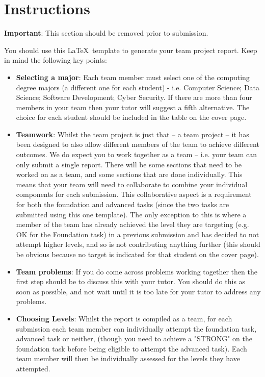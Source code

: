 \documentclass[a4paper, 11pt]{report}
\begin{document}

\tableofcontents


\newpage
\section*{Instructions}

\textbf{Important}: This section should be removed prior to submission.

You should use this \LaTeX\ template to generate your team project report. Keep in mind the following key points:
\begin{itemize}
	\item \textbf{Selecting a major}: Each team member must select one of the computing degree majors (a different one for each student) - i.e. Computer Science; Data Science; Software Development; Cyber Security. If there are more than four members in your team then your tutor will suggest a fifth alternative. The choice for each student should be included in the table on the cover page.
	\item \textbf{Teamwork}: Whilst the team project is just that -- a team project -- it has been designed to also allow different members of the team to achieve different outcomes. We do expect you to work together as a team -- i.e. your team can only submit a single report. There will be some sections that need to be worked on as a team, and some sections that are done individually. This means that your team will need to collaborate to combine your individual components for each submission. This collaborative aspect is a requirement for both the foundation and advanced tasks (since the two tasks are submitted using this one template). The only exception to this is where a member of the team has already achieved the level they are targeting (e.g. OK for the Foundation task) in a previous submission and has decided to not attempt higher levels, and so is not contributing anything further (this should be obvious because no target is indicated for that student on the cover page).
	\item \textbf{Team problems}: If you do come across problems working together then the first step should be to discuss this with your tutor. You should do this as soon as possible, and not wait until it is too late for your tutor to address any problems.
	\item \textbf{Choosing Levels}: Whilst the report is compiled as a team, for each submission each team member can individually attempt the foundation task, advanced task or neither, (though you need to achieve a "STRONG" on the foundation task before being eligible to attempt the advanced task). Each team member will then be individually assessed for the levels they have attempted.\\ 

\end{itemize}
\end{document}
